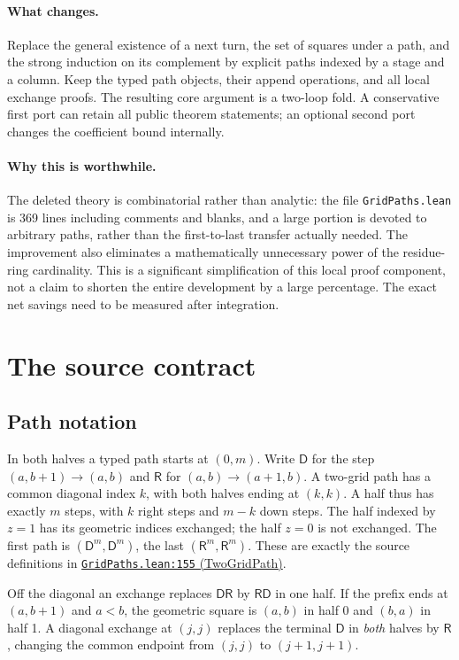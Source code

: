 \documentclass[11pt]{article}
\newcommand{\base}{https://github.com/VladimirReshetnikov/ProveIt/blob/835c3695d07c0f77060c5cc63f92eeb52a7d21c2/Analysis/GeneralizedRiemannHypothesis}
\newcommand{\auxlink}[3]{\href{\base/Lean/grh/src/New/Determinant/AuxiliaryForms/#1.lean\#L#2}{\texttt{#1.lean:#2} (#3)}}
\newcommand{\RR}{\mathsf R}
\newcommand{\DD}{\mathsf D}
\begin{document}
\paragraph{What changes.} Replace the general existence of a next turn, the set of squares under a path, and the strong induction on its complement by explicit paths indexed by a stage and a column. Keep the typed path objects, their append operations, and all local exchange proofs. The resulting core argument is a two-loop fold. A conservative first port can retain all public theorem statements; an optional second port changes the coefficient bound internally.

\paragraph{Why this is worthwhile.} The deleted theory is combinatorial rather than analytic: the file \texttt{GridPaths.lean} is 369 lines including comments and blanks, and a large portion is devoted to arbitrary paths, rather than the first-to-last transfer actually needed. The improvement also eliminates a mathematically unnecessary power of the residue-ring cardinality. This is a significant simplification of this local proof component, not a claim to shorten the entire development by a large percentage. The exact net savings need to be measured after integration.

\section{The source contract}
\subsection{Path notation}
In both halves a typed path starts at $(0,m)$. Write $\DD$ for the step $(a,b+1)\to(a,b)$ and $\RR$ for $(a,b)\to(a+1,b)$. A two-grid path has a common diagonal index $k$, with both halves ending at $(k,k)$. A half thus has exactly $m$ steps, with $k$ right steps and $m-k$ down steps. The half indexed by $z=1$ has its geometric indices exchanged; the half $z=0$ is not exchanged. The first path is $(\DD^m,\DD^m)$, the last $(\RR^m,\RR^m)$. These are exactly the source definitions in \auxlink{GridPaths}{155}{TwoGridPath}.

Off the diagonal an exchange replaces $\DD\RR$ by $\RR\DD$ in one half. If the prefix ends at $(a,b+1)$ and $a<b$, the geometric square is $(a,b)$ in half 0 and $(b,a)$ in half 1. A diagonal exchange at $(j,j)$ replaces the terminal $\DD$ in \emph{both} halves by $\RR$, changing the common endpoint from $(j,j)$ to $(j+1,j+1)$.
\end{document}

